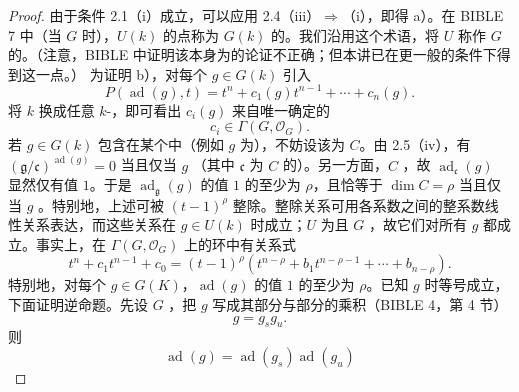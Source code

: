\begin{proof}
由于条件 2.1（i）成立，可以应用 2.4（iii）$\Rightarrow$（i），即得 a）。在 BIBLE 7 中（当 $G$ 时），$U(k)$ 的点称为 $G(k)$ 的。我们沿用这个术语，将 $U$ 称作 $G$ 的。（注意，BIBLE 中证明该本身为的论证不正确；但本讲已在更一般的条件下得到这一点。）
为证明 b），对每个 $g\in G(k)$ 引入
\[P(\operatorname{ad}(g),t)=t^n+c_1(g)t^{n-1}+\cdots+c_n(g).\]
将 $k$ 换成任意 $k$-，即可看出 $c_i(g)$ 来自唯一确定的
\[c_i\in\Gamma(G,\mathscr O_G).\]
若 $g\in G(k)$ 包含在某个中（例如 $g$ 为），不妨设该为 $C$。由 2.5（iv），有 $(\mathfrak g/\mathfrak c)^{\operatorname{ad}(g)}=0$ 当且仅当 $g$ （其中 $\mathfrak c$ 为 $C$ 的）。另一方面，$C$ ，故 $\operatorname{ad}_{\mathfrak c}(g)$ 显然仅有值 $1$。于是 $\operatorname{ad}_{\mathfrak g}(g)$ 的值 $1$ 的至少为 $\rho$，且恰等于 $\dim C=\rho$ 当且仅当 $g$ 。特别地，上述可被 $(t-1)^\rho$ 整除。整除关系可用各系数之间的整系数线性关系表达，而这些关系在 $g\in U(k)$ 时成立；$U$ 为且 $G$ ，故它们对所有 $g$ 都成立。事实上，在 $\Gamma(G,\mathscr O_G)$ 上的环中有关系式
\[t^n+c_1t^{n-1}+c_0=(t-1)^\rho(t^{n-\rho}+b_1t^{n-\rho-1}+\cdots+b_{n-\rho}).\tag{$\dagger$}\]
特别地，对每个 $g\in G(K)$，$\operatorname{ad}(g)$ 的值 $1$ 的至少为 $\rho$。已知 $g$ 时等号成立，下面证明逆命题。先设 $G$ ，把 $g$ 写成其部分与部分的乘积（BIBLE 4，第 4 节）
\[g=g_sg_u.\]
则
\[\operatorname{ad}(g)=\operatorname{ad}(g_s)\operatorname{ad}(g_u)\]

\end{proof}
